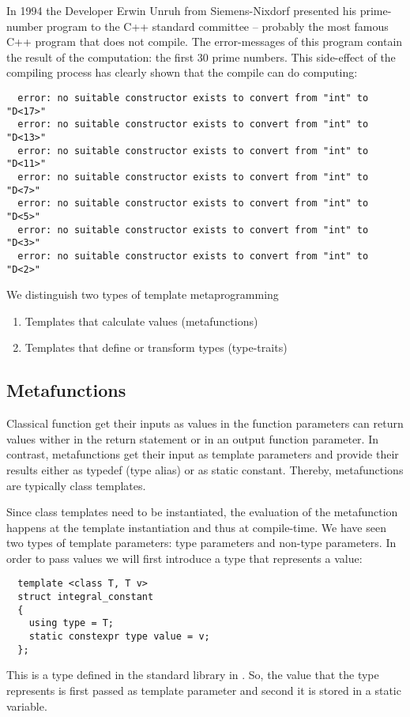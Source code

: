\begin{example}
  In 1994 the Developer Erwin Unruh from Siemens-Nixdorf presented his prime-number program to the C++ standard committee -- probably the most famous
  C++ program that does not compile. The error-messages of this program contain the result of the computation: the first 30 prime numbers. This side-effect
  of the compiling process has clearly shown that the compile can do computing:
  \begin{verbatim}
  error: no suitable constructor exists to convert from "int" to "D<17>"
  error: no suitable constructor exists to convert from "int" to "D<13>"
  error: no suitable constructor exists to convert from "int" to "D<11>"
  error: no suitable constructor exists to convert from "int" to "D<7>"
  error: no suitable constructor exists to convert from "int" to "D<5>"
  error: no suitable constructor exists to convert from "int" to "D<3>"
  error: no suitable constructor exists to convert from "int" to "D<2>"
  \end{verbatim}
\end{example}

We distinguish two types of template metaprogramming
\begin{enumerate}
  \item Templates that calculate values (metafunctions)
  \item Templates that define or transform types (type-traits)
\end{enumerate}


\subsection{Metafunctions}
Classical function get their inputs as values in the function parameters can return values wither in the return statement or in an output
function parameter. In contrast, metafunctions get their input as template parameters and provide their results either as typedef (type alias)
or as static constant. Thereby, metafunctions are typically class templates.

Since class templates need to be instantiated, the evaluation of the metafunction happens at the template instantiation and thus at compile-time.
We have seen two types of template parameters: type parameters and non-type parameters. In order to pass values we will first introduce a type
that represents a value:
%
\begin{verbatim}
  template <class T, T v>
  struct integral_constant
  {
    using type = T;
    static constexpr type value = v;
  };
\end{verbatim}
%
This is a type defined in the standard library in . So, the value that the type represents is first passed as template parameter
and second it is stored in a static  variable.


